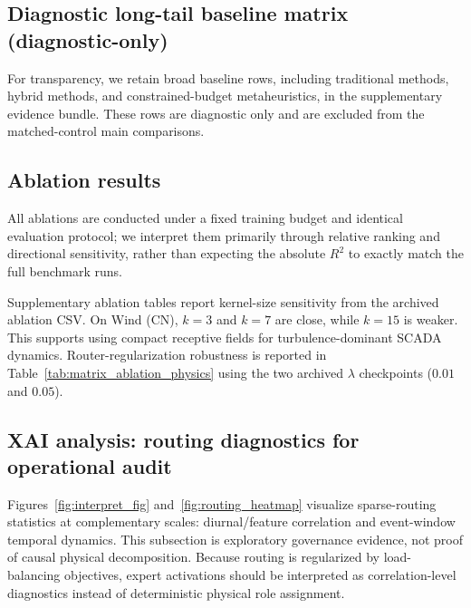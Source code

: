 \documentclass[review,1p,times]{elsarticle}
\begin{document}

\subsection{Diagnostic long-tail baseline matrix (diagnostic-only)}
\label{subsec:diag_longtail}
For transparency, we retain broad baseline rows, including traditional methods, hybrid methods, and constrained-budget metaheuristics, in the supplementary evidence bundle. These rows are diagnostic only and are excluded from the matched-control main comparisons.


\subsection{Ablation results}
\label{subsec:results_ablation}
All ablations are conducted under a fixed training budget and identical evaluation protocol; we interpret them primarily through relative ranking and directional sensitivity, rather than expecting the absolute $R^2$ to exactly match the full benchmark runs.

Supplementary ablation tables report kernel-size sensitivity from the archived ablation CSV. On Wind (CN), $k=3$ and $k=7$ are close, while $k=15$ is weaker. This supports using compact receptive fields for turbulence-dominant SCADA dynamics. Router-regularization robustness is reported in Table~\ref{tab:matrix_ablation_physics} using the two archived $\lambda$ checkpoints ($0.01$ and $0.05$).


\subsection{XAI analysis: routing diagnostics for operational audit}
\label{subsec:results_interpretability}
Figures~\ref{fig:interpret_fig} and~\ref{fig:routing_heatmap} visualize sparse-routing statistics at complementary scales: diurnal/feature correlation and event-window temporal dynamics. This subsection is exploratory governance evidence, not proof of causal physical decomposition.
Because routing is regularized by load-balancing objectives, expert activations should be interpreted as correlation-level diagnostics instead of deterministic physical role assignment.
\end{document}

